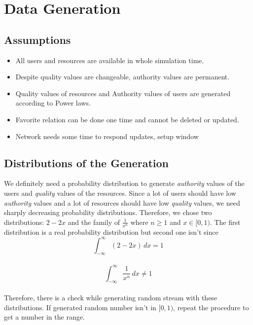 \documentclass[12pt,a4paper]{report}
\begin{document}
\chapter{Data Generation}

\section{Assumptions}

	\begin{itemize}
	\item All users and resources are available in whole simulation time.
	\item Despite quality values are changeable, authority values are permanent.
	\item Quality values of resources and Authority values of users are generated according to Power laws.
	\item Favorite relation can be done one time and cannot be deleted or updated.
	\item Network needs some time to respond updates, setup window
	\end{itemize}

\section{Distributions of the Generation}

	\hspace{0.6cm}We definitely need a probability distribution to generate \emph{authority} values of the users and \emph{quality} values of the resources. Since a lot of users should have low \emph{authority} values and a lot of resources should have low \emph{quality} values, we need sharply decreasing probability distributions. Therefore, we chose two distributions: $2 - 2x$ and the family of $\frac{1}{x^n}$ where $n\ge 1$ and $x \in [0, 1)$. The first distribution is a real probability distribution but second one isn't since \\

	$$\int_{-\infty}^{\infty} \!  (2-2x)\, dx = 1$$ \\

	$$\int_{-\infty}^{\infty} \! \frac{1}{x^n}\, dx \not= 1$$ \\

	Therefore, there is a check while generating random stream with these distributions. If generated random number isn't in $[0, 1)$, repeat the procedure to get a number in the range. \\
\end{document}
